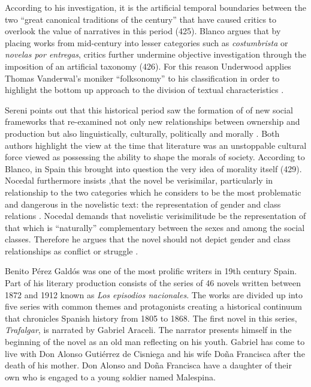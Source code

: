 \documentclass[12pt]{report}
\begin{document}
According to his investigation, it is the artificial temporal boundaries between the two \enquote{great canonical traditions of the century} that have caused critics to overlook the value of narratives in this period (425)\nocite{Blanco2000}.
Blanco argues that by placing works from mid-century into lesser categories such as \textit{costumbrista} or \textit{novelas por entregas}, critics further undermine objective investigation through the imposition of an artificial taxonomy (426)\nocite{Blanco2000}.
For this reason Underwood applies Thomas Vanderwal's moniker \enquote{folksonomy} to his classification in order to highlight the bottom up approach to the division of textual characteristics \cite{Underwood2014, Vanderwal2007}.


Sereni points out that this historical period saw the formation of of new social frameworks that re-examined not only new relationships between ownership and production but also linguistically, culturally, politically and morally \cite[Sereni in][429]{Blanco2000}.
Both authors highlight the view at the time that literature was an unstoppable cultural force viewed as possessing the ability to shape the morals of society. 
According to Blanco, in Spain this brought into question the very idea of morality itself (429)\nocite{Blanco2000}.
Nocedal furthermore insists ,that the novel be verisimilar, particularly in relationship to the two categories which he considers to be the most
problematic and dangerous in the novelistic text: the representation of gender and class relations \cite[430]{Blanco2000}.
Nocedal demands that novelistic verisimilitude be the representation of that which is “naturally” complementary between the sexes and among the social classes. 
Therefore he argues that the novel should not depict gender and class relationships as conflict or struggle \cite[430]{Blanco2000}.

Benito Pérez Galdós was one of the most prolific writers in 19th century Spain. 
Part of his literary production consists of the series of 46 novels written between 1872 and 1912 known as \textit{Los episodios nacionales}.
The works are divided up into five series with common themes and protagonists creating a historical continuum that chronicles Spanish history from 1805 to 1868.
The first novel in this series, \textit{Trafalgar}, is narrated by Gabriel Araceli.
The narrator presents himself in the beginning of the novel as an old man reflecting on his youth.
Gabriel has come to live with Don Alonso Gutiérrez de Cisniega and his wife Doña Francisca after the death of his mother.
Don Alonso and Doña Francisca have a daughter of their own who is engaged to a young soldier named Malespina.
\end{document}

